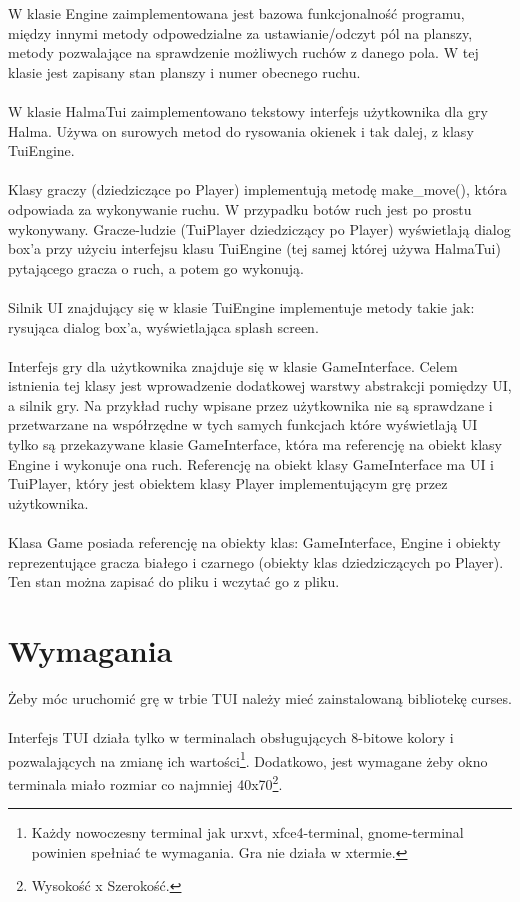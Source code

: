\documentclass[12pt, titlepage]{article}
\begin{document}
\noindent
W klasie Engine zaimplementowana jest bazowa
funkcjonalność programu, między innymi metody
odpowedzialne za ustawianie/odczyt pól na planszy,
metody pozwalające na sprawdzenie możliwych ruchów
z danego pola. W tej klasie jest zapisany stan planszy
i numer obecnego ruchu.
\\~\\
W klasie HalmaTui zaimplementowano tekstowy interfejs
użytkownika dla gry Halma. Używa on surowych metod do
rysowania okienek i tak dalej, z klasy TuiEngine.
\\~\\
Klasy graczy (dziedziczące po Player) implementują metodę
make\_move(), która odpowiada za wykonywanie ruchu. W
przypadku botów ruch jest po prostu wykonywany. Gracze-ludzie
(TuiPlayer dziedziczący po Player) wyświetlają dialog box'a
przy użyciu interfejsu klasu TuiEngine (tej samej której używa
HalmaTui) pytającego gracza o ruch, a potem go wykonują.
\\~\\
Silnik UI znajdujący się w klasie TuiEngine implementuje metody
takie jak: rysująca dialog box'a, wyświetlająca splash screen.
\\~\\
Interfejs gry dla użytkownika znajduje się w klasie GameInterface.
Celem istnienia tej klasy jest wprowadzenie dodatkowej warstwy
abstrakcji pomiędzy UI, a silnik gry. Na przykład ruchy wpisane
przez użytkownika nie są sprawdzane i przetwarzane na współrzędne
w tych samych funkcjach które wyświetlają UI tylko są przekazywane
klasie GameInterface, która ma referencję na obiekt klasy Engine i wykonuje
ona ruch. Referencję na obiekt klasy GameInterface ma UI i TuiPlayer,
który jest obiektem klasy Player implementującym grę przez użytkownika.
\\~\\
Klasa Game posiada referencję na obiekty klas: GameInterface, Engine i
obiekty reprezentujące gracza białego i czarnego (obiekty klas
dziedziczących po Player). Ten stan można zapisać do pliku i wczytać
go z pliku.

\pagebreak
\section{Wymagania}
Żeby móc uruchomić grę w trbie TUI należy mieć zainstalowaną
bibliotekę curses.
\\~\\
Interfejs TUI działa tylko w terminalach obsługujących 8-bitowe
kolory i pozwalających na zmianę ich wartości\footnote{Każdy nowoczesny terminal jak urxvt, xfce4-terminal, gnome-terminal powinien spełniać te wymagania. Gra nie działa w xtermie.}.
Dodatkowo, jest wymagane żeby okno terminala miało rozmiar co
najmniej 40x70\footnote{Wysokość x Szerokość.}.
\end{document}
